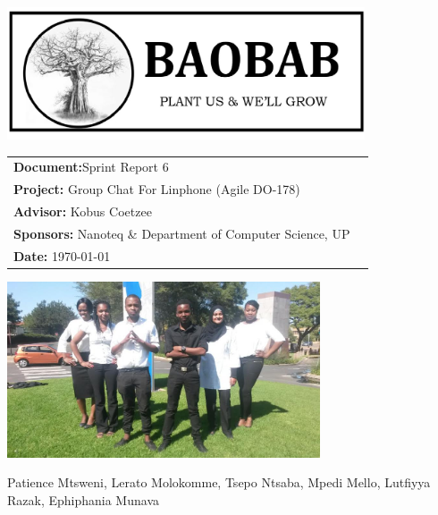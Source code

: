 \begin{titlepage}

\begin{center}

\includegraphics[width=400px]{pictures/logo.jpg}
\vspace{0.5 cm}
\begin{flushright} \large
\begin{tabular}{lr}
\vspace{1 cm}
\LARGE\textbf{Document:}Sprint Report 6\\

\vspace{1 cm}
\LARGE\textbf{Project:} Group Chat For Linphone (Agile DO-178)\\
\vspace{1 cm}
\LARGE\textbf{Advisor:} Kobus Coetzee\\
\vspace{1 cm}
\LARGE\textbf{Sponsors:} Nanoteq \& Department of Computer Science, UP\\
\vspace{1 cm}
\LARGE\textbf{Date: }\today\\
\end{tabular}
\end{flushright}

\centering \includegraphics[width=350px]{pictures/Team.jpg}

Patience Mtsweni, Lerato Molokomme, Tsepo Ntsaba, Mpedi Mello, Lutfiyya Razak, Ephiphania Munava\\


\end{center}
\end{titlepage}